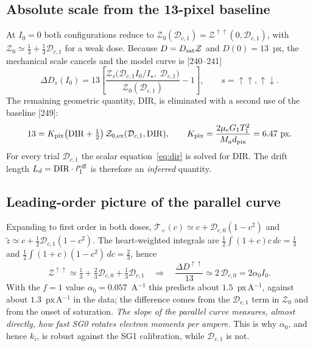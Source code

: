 \documentclass[11pt,a4paper]{article}
\newcommand{\D}{\mathcal{D}}
\newcommand{\Z}{\mathcal{Z}}
\newcommand{\T}{\mathcal{T}}
\newcommand{\pp}{{\uparrow\uparrow}}
\newcommand{\pa}{{\uparrow\downarrow}}
\newcommand{\DIR}{\mathrm{DIR}}
\begin{document}
\subsection{Absolute scale from the 13-pixel baseline}

At $I_0=0$ both configurations reduce to $\Z_0(\D_{c,1})=\Z^\pp(0,\D_{c,1})$, with
$\Z_0\simeq\tfrac13+\tfrac13\D_{c,1}$ for a weak dose. Because $D=D_{\rm sat}\Z$ and $D(0)=13$~px,
the mechanical scale cancels and the model curve is [240--241]
\begin{equation}
\boxed{\;
\Delta D_s(I_0)=13\left[\frac{\Z_s\big(\D_{c,1}I_0/I_\star,\;\D_{c,1}\big)}{\Z_0(\D_{c,1})}-1\right],
\qquad s=\pp,\pa .\;}
\label{eq:model}
\end{equation}
The remaining geometric quantity, $\DIR$, is eliminated with a second use of the baseline [249]:
\begin{equation}
13=K_{\rm pix}\big(\DIR+\tfrac12\big)\,\Z_{0,\rm ex}(\D_{c,1},\DIR),\qquad
K_{\rm pix}=\frac{2\mu_eG_1T_1^2}{M_ad_{\rm pix}}=6.47~\text{px}.
\label{eq:dir}
\end{equation}
For every trial $\D_{c,1}$ the scalar equation~\eqref{eq:dir} is solved for $\DIR$. The drift length
$L_d=\DIR\cdot\ell_1^{\rm eff}$ is therefore an \emph{inferred} quantity.

\subsection{Leading-order picture of the parallel curve}
\label{sec:leading}

Expanding to first order in both doses, $\T_+(c)\simeq c+\D_{c,0}(1-c^2)$ and
$\tilde z\simeq c+\tfrac12\D_{c,1}(1-c^2)$. The heart-weighted integrals are
$\tfrac12\int(1+c)c\,dc=\tfrac13$ and $\tfrac12\int(1+c)(1-c^2)\,dc=\tfrac23$, hence
\begin{equation}
\Z^\pp\simeq\tfrac13+\tfrac23\D_{c,0}+\tfrac13\D_{c,1}
\quad\Longrightarrow\quad
\frac{\Delta D^\pp}{13}\simeq2\,\D_{c,0}=2\alpha_0I_0 .
\end{equation}
With the $f=1$ value $\alpha_0=0.057$~A$^{-1}$ this predicts about $1.5$~px\,A$^{-1}$, against about $1.3$~px\,A$^{-1}$ in the data; the difference
comes from the $\D_{c,1}$ term in $\Z_0$ and from the onset of saturation. \emph{The slope of the
parallel curve measures, almost directly, how fast SG0 rotates electron moments per ampere.} This is
why $\alpha_0$, and hence $k_i$, is robust against the SG1 calibration, while $\D_{c,1}$ is not.
\end{document}
